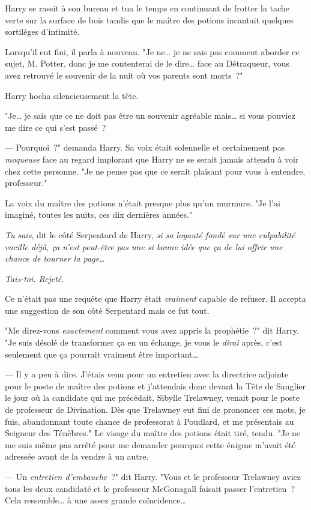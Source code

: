 Harry se rassit à son bureau et tua le temps en continuant de frotter la tache verte sur la surface de bois tandis que le maître des potions incantait quelques sortilèges d'intimité.

Lorsqu'il eut fini, il parla à nouveau. "Je ne… je ne sais pas comment aborder ce sujet, M. Potter, donc je me contenterai de le dire… face au Détraqueur, vous avez retrouvé le souvenir de la nuit où vos parents sont morts~?"

Harry hocha silencieusement la tête.

"Je… je sais que ce ne doit pas être un souvenir agréable mais… si vous pouviez me dire ce qui s'est passé~?

--- Pourquoi~?" demanda Harry. Sa voix était solennelle et certainement pas \emph{moqueuse} face au regard implorant que Harry ne se serait jamais attendu à voir chez cette personne. "Je ne pense pas que ce serait plaisant pour vous à entendre, professeur."

La voix du maître des potions n'était presque plus qu'un murmure. "Je l'ai imaginé, toutes les nuits, ces dix dernières années."

\emph{Tu sais}, dit le côté Serpentard de Harry, \emph{si sa loyauté fondé sur une culpabilité vacille déjà, ça n'est peut-être pas une si bonne idée que ça de lui offrir une chance de tourner la page…}

\emph{Tais-toi. Rejeté.}

Ce n'était pas une requête que Harry était \emph{vraiment} capable de refuser. Il accepta une suggestion de son côté Serpentard mais ce fut tout.

"Me direz-vous \emph{exactement} comment vous avez appris la prophétie~?" dit Harry. "Je suis désolé de transformer ça en un échange, je vous le \emph{dirai} après, c'est seulement que ça pourrait vraiment être important…

--- Il y a peu à dire. J'étais venu pour un entretien avec la directrice adjointe pour le poste de maître des potions et j'attendais donc devant la Tête de Sanglier le jour où la candidate qui me précédait, Sibylle Trelawney, venait pour le poste de professeur de Divination. Dès que Trelawney eut fini de prononcer ces mots, je fuis, abandonnant toute chance de professorat à Poudlard, et me présentais au Seigneur des Ténèbres." Le visage du maître des potions était tiré, tendu. "Je ne me suis même pas arrêté pour me demander pourquoi cette énigme m'avait été adressée avant de la vendre à un autre.

--- Un \emph{entretien d'embauche}~?" dit Harry. "Vous et le professeur Trelawney aviez tous les deux candidaté et le professeur McGonagall faisait passer l'entretien~? Cela ressemble… à une assez grande coïncidence…

